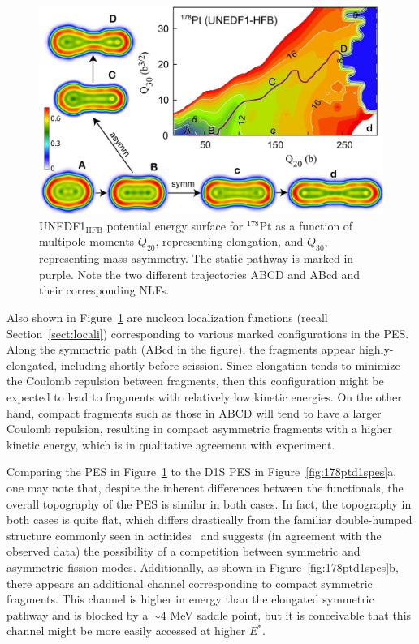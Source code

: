 \begin{figure}
	\centering
	\includegraphics[width=0.7\linewidth]{TeX_files/178Pt_unedf1_pes.jpg}
	\caption[UNEDF1$_\mathrm{HFB}$ potential energy surface for $^{178}$Pt as a function of multipole moments $Q_{20}$, representing elongation, and $Q_{30}$, representing mass asymmetry. The static pathway is marked in purple. Note the two different trajectories ABCD and ABcd and their corresponding NLFs.]{UNEDF1$_\mathrm{HFB}$ potential energy surface for $^{178}$Pt as a function of multipole moments $Q_{20}$, representing elongation, and $Q_{30}$, representing mass asymmetry. The static pathway is marked in purple. Note the two different trajectories ABCD and ABcd and their corresponding NLFs.}
	\label{fig:178ptunedf1pes}
\end{figure}

Also shown in Figure~\ref{fig:178ptunedf1pes} are nucleon localization functions (recall Section~\ref{sect:locali}) corresponding to various marked configurations in the PES. Along the symmetric path (ABcd in the figure), the fragments appear highly-elongated, including shortly before scission. Since elongation tends to minimize the Coulomb repulsion between fragments, then this configuration might be expected to lead to fragments with relatively low kinetic energies. On the other hand, compact fragments such as those in ABCD will tend to have a larger Coulomb repulsion, resulting in compact asymmetric fragments with a higher kinetic energy, which is in qualitative agreement with experiment.

Comparing the {\hfb} PES in Figure~\ref{fig:178ptunedf1pes} to the D1S PES in Figure~\ref{fig:178ptd1spes}a, one may note that, despite the inherent differences between the functionals, the overall topography of the PES is similar in both cases. In fact, the topography in both cases is quite flat, which differs drastically from the familiar double-humped structure commonly seen in actinides~\cite{bjørnholm1980a} and suggests (in agreement with the observed data) the possibility of a competition between symmetric and asymmetric fission modes. Additionally, as shown in Figure~\ref{fig:178ptd1spes}b, there appears an additional channel corresponding to compact symmetric fragments. This channel is higher in energy than the elongated symmetric pathway and is blocked by a ${\sim}4$ MeV saddle point, but it is conceivable that this channel might be more easily accessed at higher $E^*$. %

